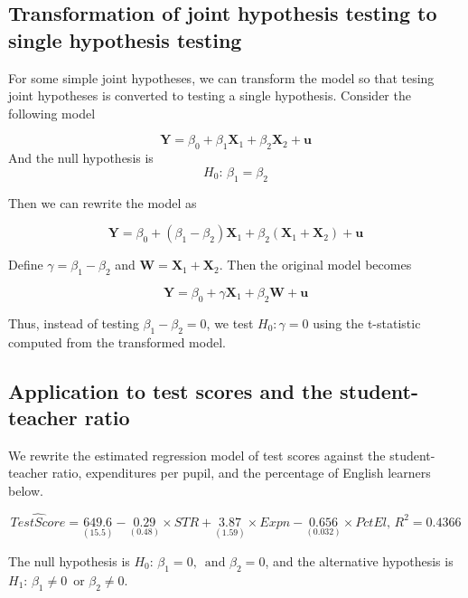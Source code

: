 \documentclass[a4paper,11pt]{article}
\begin{document}
\subsection{Transformation of joint hypothesis testing to single hypothesis testing}
\label{sec:org91d207a}

For some simple joint hypotheses, we can transform the model so that
tesing joint hypotheses is converted to testing a single
hypothesis. Consider the following model

\[ \mathbf{Y} = \beta_0 +
\beta_1 \mathbf{X}_1 + \beta_2 \mathbf{X}_2 + \mathbf{u} \] And the
null hypothesis is \[ H_0:\, \beta_1 = \beta_2 \]

Then we can rewrite the model as

\begin{equation*}
\mathbf{Y} = \beta_0 + (\beta_1 - \beta_2) \mathbf{X}_1 + \beta_2 (\mathbf{X}_1 + \mathbf{X}_2) + \mathbf{u}
\end{equation*}

Define \(\gamma = \beta_1 - \beta_2\) and \(\mathbf{W} =
\mathbf{X}_1 + \mathbf{X}_2\). Then the original model becomes

\[ \mathbf{Y} = \beta_0 + \gamma \mathbf{X}_1 + \beta_2
\mathbf{W} + \mathbf{u} \]

Thus, instead of testing \(\beta_1 - \beta_2 = 0\), we test \(H_0: \gamma
= 0\) using the t-statistic computed from the transformed model.


\subsection{Application to test scores and the student-teacher ratio}
\label{sec:orgef4a9ff}

We rewrite the estimated regression model of test scores against
the student-teacher ratio, expenditures per pupil, and the percentage of
English learners below.

\begin{equation*}
\widehat{TestScore} = \underset{{\displaystyle (15.5)}}{649.6}
- \underset{\displaystyle (0.48)}{0.29} \times STR
+ \underset{\displaystyle (1.59)}{3.87} \times Expn
- \underset{\displaystyle (0.032)}{0.656} \times PctEl,\, R^2 = 0.4366
\end{equation*}

The null hypothesis is \(H_0:\, \beta_1 = 0,\,\text{ and } \beta_2 = 0\), and the
alternative hypothesis is \(H_1:\, \beta_1 \neq 0\,\text{ or } \beta_2
\neq 0\).
\end{document}
